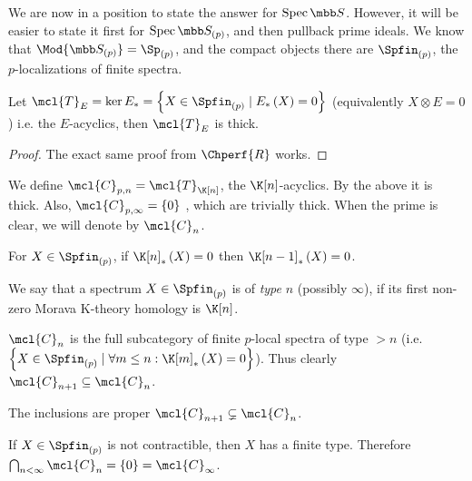 We are now in a position to state the answer for $\spec \SS$.
However, it will be easier to state it first for $\spec \SS_{\left(p\right)}$, and then pullback prime ideals.
We know that $\Mod{\SS_{\left(p\right)}} = \Sp_{\left(p\right)}$, and the compact objects there are $\Spfin_{\left(p\right)}$, the $p$-localizations of finite spectra.

\begin{proposition}
	Let
	$
	\mcl{T}_E
	= \ker E_*
	= \left\{ X \in \Spfin_{\left(p\right)} \mid E_{*}\left(X\right)=0 \right\}$
	(equivalently $X \otimes E = 0$) i.e. the $E$-acyclics, then $\mcl{T}_E$ is thick.
\end{proposition}

\begin{proof}
	The exact same proof from $\Chperf{R}$ works.
\end{proof}

\begin{definition}
	We define $\mcl{C}_{p, n} = \mcl{T}_{\K[n]}$, the $\K[n]$-acyclics.
	By the above it is thick.
	Also, $\mcl{C}_{p, \infty} = \left\{ 0\right\}$ , which are trivially thick.
	When the prime is clear, we will denote by $\mcl{C}_n$.
\end{definition}

\begin{proposition}
	For $X \in \Spfin_{\left(p\right)}$, if $\K[n]_{*}\left(X\right) = 0$ then $\K[n-1]_*\left(X\right) = 0$.
\end{proposition}

\begin{definition}
	We say that a spectrum $X \in \Spfin_{\left(p\right)}$ is of \emph{type} $n$ (possibly $\infty$), if its first non-zero Morava K-theory homology is $\K[n]$.
\end{definition}

\begin{corollary}
	$\mcl{C}_n$ is the full subcategory of finite $p$-local spectra of type $> n$ (i.e. $\left\{ X \in \Spfin_{\left(p\right)} \mid \forall m \leq n: \K[m]_*\left(X\right) = 0 \right\}$).
	Thus clearly $\mcl{C}_{n+1} \subseteq \mcl{C}_n$.
\end{corollary}

\begin{proposition}
	The inclusions are proper $\mcl{C}_{n+1} \subsetneq \mcl{C}_n$.
\end{proposition}

\begin{proposition}
	If $X \in \Spfin_{\left(p\right)}$ is not contractible, then $X$ has a finite type.
	Therefore $\bigcap_{n < \infty} \mcl{C}_n = \left\{0\right\} = \mcl{C}_\infty$.
\end{proposition}

